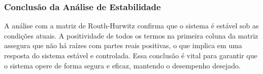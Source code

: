 \subsubsection{Conclusão da Análise de Estabilidade}

A análise com a matriz de Routh-Hurwitz confirma que o sistema é estável sob as condições atuais. A positividade de todos os termos na primeira coluna da matriz assegura que não há raízes com partes reais positivas, o que implica em uma resposta do sistema estável e controlada. Essa conclusão é vital para garantir que o sistema opere de forma segura e eficaz, mantendo o desempenho desejado.